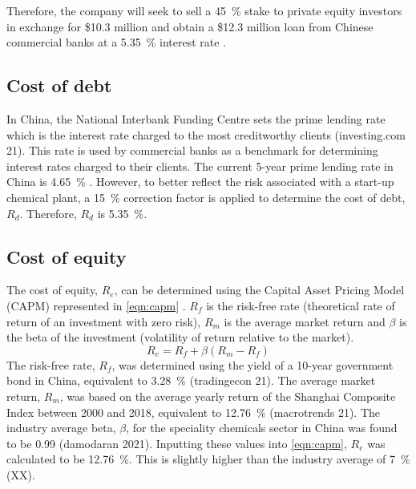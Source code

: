 Therefore, the company will seek to sell a \SI{45}{\percent} stake to private equity investors in exchange for \$10.3 million and obtain a \$12.3 million loan from Chinese commercial banks at a \SI{5.35}{\percent} interest rate \cite{rmb_industrial_21}.

\subsection{Cost of debt}
\label{sec:debt}
In China, the National Interbank Funding Centre sets the prime lending rate which is the interest rate charged to the most creditworthy clients (investing.com 21). This rate is used by commercial banks as a benchmark for determining interest rates charged to their clients. The current 5-year prime lending rate in China is \SI{4.65}{\percent} \cite{rmb_industrial_21}. However, to better reflect the risk associated with a start-up chemical plant, a \SI{15}{\percent} correction factor is applied to determine the cost of debt, $R_{d}$. Therefore, $R_{d}$ is \SI{5.35}{\percent}.

\subsection{Cost of equity}
\label{sec:equity}
The cost of equity, $R_{e}$, can be determined using the Capital Asset Pricing Model (CAPM) represented in \cref{eqn:capm} \cite{kenton_21}. $R_{f}$ is the risk-free rate (theoretical rate of return of an investment with zero risk), $R_{m}$ is the average market return and $\beta$ is the beta of the investment (volatility of return relative to the market).
\begin{equation}
\label{eqn:capm}
    R_{e}=R_{f}+\beta(R_{m}-R_{f})
\end{equation}
The risk-free rate, $R_{f}$, was determined using the yield of a 10-year government bond in China, equivalent to \SI{3.28}{\percent} (tradingecon 21). The average market return, $R_{m}$, was based on the average yearly return of the Shanghai Composite Index between 2000 and 2018, equivalent to \SI{12.76}{\percent} (macrotrends 21). The industry average beta, $\beta$, for the speciality chemicals sector in China was found to be 0.99 (damodaran 2021). Inputting these values into \cref{eqn:capm}, $R_{e}$ was calculated to be \SI{12.76}{\percent}. This is slightly higher than the industry average of \SI{7}{\percent} (XX).

